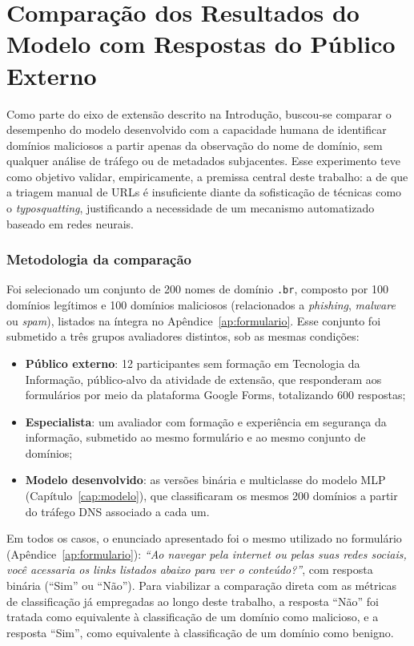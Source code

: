 \chapter{Comparação dos Resultados do Modelo com Respostas do Público Externo}
\label{cap:resultados-extensao}

Como parte do eixo de extensão descrito na Introdução, buscou-se comparar o desempenho do modelo desenvolvido com a capacidade humana de identificar domínios maliciosos a partir apenas da observação do nome de domínio, sem qualquer análise de tráfego ou de metadados subjacentes. Esse experimento teve como objetivo validar, empiricamente, a premissa central deste trabalho: a de que a triagem manual de URLs é insuficiente diante da sofisticação de técnicas como o \textit{typosquatting}, justificando a necessidade de um mecanismo automatizado baseado em redes neurais.

\subsection*{Metodologia da comparação}

Foi selecionado um conjunto de 200 nomes de domínio \texttt{.br}, composto por 100 domínios legítimos e 100 domínios maliciosos (relacionados a \textit{phishing}, \textit{malware} ou \textit{spam}), listados na íntegra no Apêndice~\ref{ap:formulario}. Esse conjunto foi submetido a três grupos avaliadores distintos, sob as mesmas condições:

\begin{itemize}
    \item \textbf{Público externo}: 12 participantes sem formação em Tecnologia da Informação, público-alvo da atividade de extensão, que responderam aos formulários por meio da plataforma Google Forms, totalizando 600 respostas;
    \item \textbf{Especialista}: um avaliador com formação e experiência em segurança da informação, submetido ao mesmo formulário e ao mesmo conjunto de domínios;
    \item \textbf{Modelo desenvolvido}: as versões binária e multiclasse do modelo MLP (Capítulo~\ref{cap:modelo}), que classificaram os mesmos 200 domínios a partir do tráfego DNS associado a cada um.
\end{itemize}

Em todos os casos, o enunciado apresentado foi o mesmo utilizado no formulário (Apêndice~\ref{ap:formulario}): \textit{``Ao navegar pela internet ou pelas suas redes sociais, você acessaria os links listados abaixo para ver o conteúdo?''}, com resposta binária (``Sim'' ou ``Não''). Para viabilizar a comparação direta com as métricas de classificação já empregadas ao longo deste trabalho, a resposta ``Não'' foi tratada como equivalente à classificação de um domínio como malicioso, e a resposta ``Sim'', como equivalente à classificação de um domínio como benigno.

